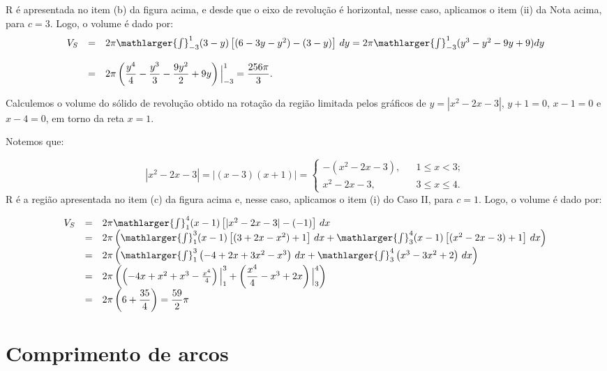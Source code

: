 \cleardoublepage\documentclass[../main.tex]{subfiles}
\begin{document}
\begin{ex}
\begin{compactenum}[a)]
\begin{solution}
R é apresentada no item (b) da figura acima, e desde que o eixo de revolução é horizontal, nesse caso, aplicamos o item (ii) da Nota acima, para \(c=3\). Logo, o volume é dado por:
\[\begin{array}{rcl} V_S&=& 2\pi \mathlarger{\int}^{1}_{-3}(3-y)\left[(6-3y-y^2)-(3-y) \right]\,dy =2\pi \mathlarger{\int}^{1}_{-3}(y^3-y^2-9y+9)dy\\ \\ &=& 2\pi \left(\dfrac{y^4}{4}-\dfrac{y^3}{3}-\dfrac{9y^2}{2}+9y\right)\Big{|}^{1}_{-3} = \dfrac{256\pi}{3}. \end{array} \]
\end{solution}
\item Calculemos o volume do sólido de revolução obtido na rotação da região limitada pelos gráficos de \(y=|x^2-2x-3|\), \(y+1=0\), \(x-1=0\) e \(x-4=0\), em torno da reta \(x=1\).

\begin{solution}
Notemos que:

\[ |x^2-2x-3|= |(x-3)(x+1)|=\left\{ \begin{array}{ccl} -(x^2-2x-3),& & 1\leq x< 3;\\ x^2-2x-3,& & 3\leq x\leq 4. \end{array} \right. \]
R é a região apresentada no item (c) da figura acima e, nesse caso, aplicamos o item (i) do Caso II, para \(c=1\). Logo, o volume é dado por:

\[ \begin{array}{rcl} V_S &=& 2\pi \mathlarger{\int}^{4}_{1}(x-1)\left[|x^2-2x-3|-(-1) \right]\,dx\\ &=& 2\pi \left(\mathlarger{\int}^{3}_{1} (x-1)\left[(3+2x -x^2)+1 \right]\,dx + \mathlarger{\int}^{4}_{3}(x-1)\left[(x^2-2x-3)+1 \right]\,dx\right)\\ &=& 2\pi \left( \mathlarger{\int}^{3}_{1}\left(-4+2x+3x^2-x^3 \right)\,dx + \mathlarger{\int}^{4}_{3}\left(x^3 -3x^2+2\right)\,dx \right)\\ &=& 2\pi \left( \left(-4x+x^2+x^3-\frac{x^4}{4} \right)\Big{|}^{3}_{1} + \left(\dfrac{x^4}{4} -x^3+2x\right)\Big{|}^{4}_{3} \right)\\ &=& 2\pi \left( 6+\dfrac{35}{4} \right)= \dfrac{59}{2}\pi\, \end{array} \]
\end{solution}
\end{compactenum}
\end{ex}

\section{Comprimento de arcos}
\end{document}
